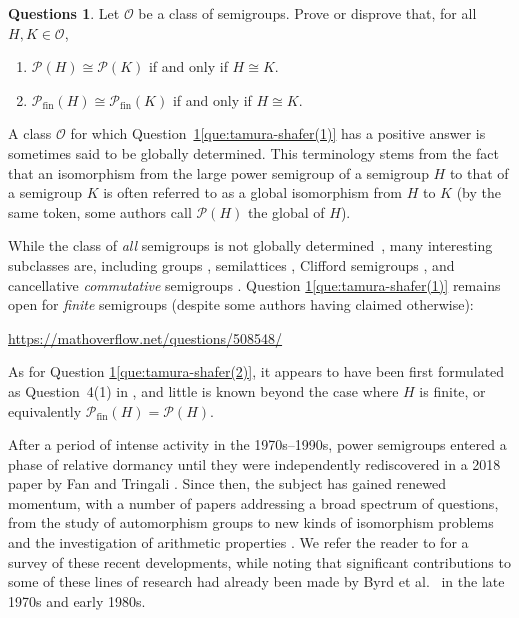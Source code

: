 \documentclass[11pt,reqno]{amsart}
\theoremstyle{definition}
\newtheorem{questions}[theorem]{Questions}
\theoremstyle{remark}
\theoremstyle{theoremdd}
\newcommand{\evid}[1]{\textsf{#1}}
\newcommand{\fin}{\mathrm{fin}}
\renewcommand{\,}{\kern 0.1em}
\begin{document}
\begin{questions}
\label{que:tamura-shafer}
Let $\mathcal O$ be a class of semigroups. Prove or disprove that, for all $H, K \in \mathcal O$, 
\begin{enumerate}[label=\textup{(\arabic{*})}]
\item\label{que:tamura-shafer(1)}
$\mathcal P(H) \cong \mathcal P(K)$ if and only if $H \cong K$.
\item\label{que:tamura-shafer(2)} $\mathcal P_\fin(H) \cong \mathcal P_\fin(K)$ if and only if $H \cong K$.
\end{enumerate}
\end{questions}

A class $\mathcal{O}$ for which Question~\ref{que:tamura-shafer}\ref{que:tamura-shafer(1)} has a positive answer is sometimes said to be \evid{globally determined}. This terminology stems from the fact that an isomorphism from the large power 
semigroup of a semigroup $H$ to that of a semigroup $K$ is often referred to as a \evid{global isomorphism} from $H$ to $K$ (by the same token, some 
authors call $\mathcal{P}(H)$ the \evid{global} of $H$).

While the class of \emph{all} semigroups is not globally 
determined~\cite{Mog-1973}, many interesting subclasses are,  including groups \cite{Sha-1967},
semilattices \cite[p.~218]{Kob-1984}, Clifford semigroups
\cite[Theorem~4.7]{Gan-Zha-2014}, and cancellative \emph{commutative} semigroups \cite[Corollary~1]{Tri-2025(c)}. Question \ref{que:tamura-shafer}\ref{que:tamura-shafer(1)} remains open for \textit{finite} semigroups (despite some authors having claimed otherwise):

\begin{center}
\url{https://mathoverflow.net/questions/508548/}
\end{center}

As for Question \ref{que:tamura-shafer}\ref{que:tamura-shafer(2)}, it appears to have been first formulated as Question~4(1) in \cite{GarSan-Tri2025(a)}, and little is known beyond the case where $H$ is finite, or equivalently $\mathcal{P}_{\fin}(H) = \mathcal{P}(H)$.

After a period of intense activity in the 1970s--1990s, power
semigroups entered a phase of relative dormancy until they were
independently rediscovered in a 2018 paper by Fan and Tringali
\cite{Fa-Tr18}. Since then, the subject has gained renewed momentum, with a number of papers addressing a broad spectrum of questions, from the study of automorphism groups
\cite{Tri-Yan2025(b), Tri-Wen-2026(a), Rago26(b), Tri-Wen-2026(b), Wong2026}
to new kinds of isomorphism problems
\cite{Bie-Ger-22, Tri-Yan2025(a), GarSan-Tri2025(a), Rago26,
Tri-Yan2026(a), Rago26(c)} and the investigation of arithmetic properties
\cite{An-Tr18, Bie-Ger-22, 
Gonz-Li-Rabi-Rodr-Tira-2025, Cos-Tri2025}. We refer the reader to \cite{Tri-Survey} for a survey of these
recent developments, while noting that significant contributions to some of these lines of research had already been made by Byrd et al.~\cite{Byr-Llo-Ped-Ste-1977, Byr-Llo-Men-Tel-1978, Byr-Llo-Ste-1982, Byr-Llo-Ped-Ste-1984} in the late 1970s and early 1980s.
\end{document}
